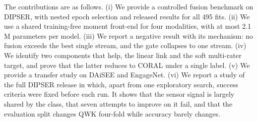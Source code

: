 The contributions are as follows. (i) We provide a controlled fusion benchmark on DIPSER, with nested epoch selection and released results for all 495 fits. (ii) We use a shared training-free moment front-end for four modalities, with at most 2.1\,M parameters per model. (iii) We report a negative result with its mechanism: no fusion exceeds the best single stream, and the gate collapses to one stream. (iv) We identify two components that help, the linear link and the soft multi-rater target, and prove that the latter reduces to CORAL under a single label. (v) We provide a transfer study on DAiSEE and EngageNet. (vi) We report a study of the full DIPSER release in which, apart from one exploratory search, success criteria were fixed before each run. It shows that the sensor signal is largely shared by the class, that seven attempts to improve on it fail, and that the evaluation split changes QWK four-fold while accuracy barely changes.
